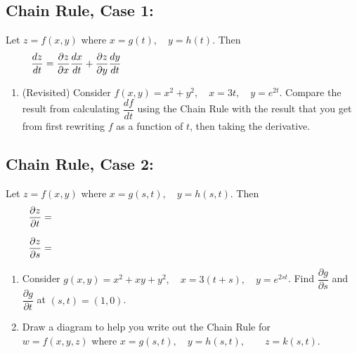 \subsection*{Chain Rule, Case 1:}
Let \(z=f(x,y)\) where \(x=g(t), \quad y = h(t)\). Then\\
\[\dfrac{dz}{dt} = \dfrac{\partial z}{\partial x} \dfrac{dx}{dt} + \dfrac{\partial z}{\partial y} \dfrac{dy}{dt} \hspace*{3in}\]

\begin{enumerate}[{Example} 1: ]
\item (Revisited) Consider \(f(x,y)=x^2+y^2, \quad x=3t, \quad y = e^{2t}\). Compare the result from calculating \(\dfrac{df}{dt}\) using the Chain Rule with the result that you get from first rewriting \(f\) as a function of \(t\), then taking the derivative.
\vfill


\end{enumerate}

\subsection*{Chain Rule, Case 2:}
Let \(z=f(x,y)\) where \(x=g(s,t), \quad y = h(s,t)\). Then\\
\[\dfrac{\partial z}{\partial t} = \hspace*{4in}\] 

\[\dfrac{\partial z}{\partial s} =\hspace*{4in}\]

\begin{enumerate}[{Example} 1: ]
\addtocounter{enumi}{1}
\item Consider \(g(x,y)=x^2+xy+ y^2, \quad x=3(t+s), \quad y = e^{2st}\).
 Find \(\dfrac{\partial g}{\partial s}\) and \(\dfrac{\partial g}{\partial t}\) at \((s,t) = (1,0)\).
\vfill

\item Draw a diagram to help you write out the Chain Rule for\\ \(w=f(x,y,z)\) where \(x=g(s,t), \quad y = h(s,t), \qquad z=k(s,t)\).

\vfill

\end{enumerate}



